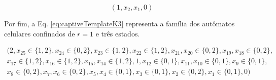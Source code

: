 \begin{equation}
(1,x_2,x_1,0)
\label{eq:captiveTemplateR05}
\end{equation}

Por fim, a Eq. \eqref{eq:captiveTemplateK3} representa a família dos autômatos celulares confinados de $r=1$ e três estados.

\begin{equation}
\begin{split}
(2, x_{25} \in \{1,2\}, x_{24} \in \{0,2\}, x_{23} \in \{1,2\}, x_{22} \in \{1,2\}, x_{21}, x_{20} \in \{0,2\}, x_{19}, x_{18} \in \{0,2\}, \\
x_{17} \in \{1,2\}, x_{16} \in \{1,2\}, x_{15}, x_{14} \in \{1,2\},1, x_{12} \in \{0,1\}, x_{11}, x_{10} \in \{0,1\}, x_9 \in \{0,1\}, \\
x_8 \in \{0,2\}, x_7, x_6 \in \{0,2\}, x_5, x_4 \in \{0,1\}, x_3 \in \{0,1\}, x_2 \in \{0,2\}, x_1 \in \{0,1\}, 0)
\label{eq:captiveTemplateK3}
\end{split}
\end{equation}
